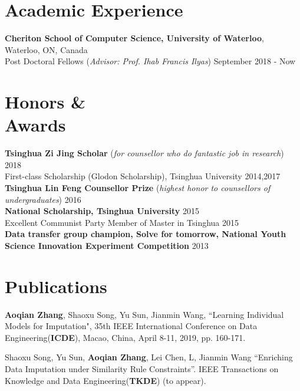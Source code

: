 \documentclass[margin]{cv}
\begin{document}
\begin{resume}
\section{\sc Academic Experience}
{\bf Cheriton School of Computer Science, University of Waterloo}, Waterloo, ON, Canada \\
Post Doctoral Fellows ({\it Advisor: Prof. Ihab Francis Ilyas}) \hfill September 2018 - Now

\section{\sc Honors \& \\ Awards}
{\bf Tsinghua Zi Jing Scholar} ({\it for counsellor who do fantastic job in research}) \hfill 2018 \\
First-class Scholarship (Glodon Scholarship), Tsinghua University \hfill 2014,2017 \\
{\bf Tsinghua Lin Feng Counsellor Prize} ({\it highest honor to counsellors of undergraduates}) \hfill 2016 \\
{\bf National Scholarship, Tsinghua University} \hfill 2015 \\
Excellent Communist Party Member of Master in Tsinghua \hfill 2015 \\
{\bf Data transfer group champion, Solve for tomorrow, National Youth Science Innovation Experiment Competition} \hfill 2013

\section{\sc Publications}


\begin{enumerate}[{[}1{]}]
\item {\bf Aoqian Zhang}, {Shaoxu Song}, {Yu Sun}, {Jianmin Wang}, ``Learning Individual Models for Imputation", 35th {IEEE} International Conference on Data Engineering({\bf ICDE}), Macao, China, April 8-11, 2019, pp. 160-171. 

\item {Shaoxu Song}, {Yu Sun}, {\bf Aoqian Zhang}, {Lei Chen, L}, {Jianmin Wang}  ``Enriching Data Imputation under Similarity Rule Constraints''. IEEE Transactions on Knowledge and Data Engineering({\bf TKDE}) (to appear).


\end{enumerate}
\end{resume}
\end{document}
